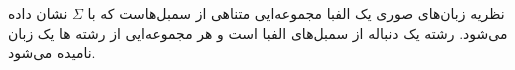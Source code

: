 \begin{itemframe}{نظریه زبان‌های صوری}
\itm
یک الفبا
 مجموعه‌ایی متناهی از سمبل‌هاست که با  $\Sigma$ نشان داده می‌شود. رشته یک دنباله از سمبل‌های الفبا است و هر مجموعه‌ایی از رشته ها یک زبان نامیده می‌شود.

\end{itemframe}